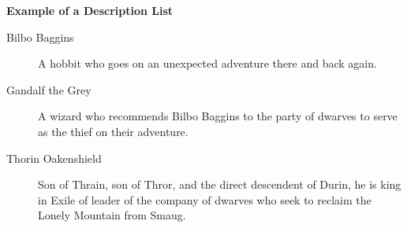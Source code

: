 \documentclass{article}
\begin{document}
\begin{center}

\textbf{Example of a Description List}

\end{center}

\begin{description}

\item[Bilbo Baggins]

A hobbit who goes on an unexpected adventure there and back again.

\item[Gandalf the Grey]

A wizard who recommends Bilbo Baggins to the party of dwarves to serve as the thief on their adventure.

\item[Thorin Oakenshield]

Son of Thrain, son of Thror, and the direct descendent of Durin, he is king in Exile of leader of the company of dwarves who seek to reclaim the Lonely Mountain from Smaug. 

\end{description}
\end{document}
